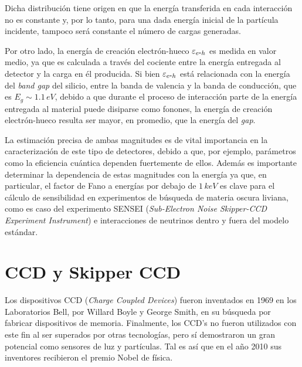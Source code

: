 Dicha distribución tiene origen en que la energía transferida en cada interacción no es constante y, por lo tanto, para una dada energía inicial de la partícula incidente, tampoco será constante el número de cargas generadas.

Por otro lado, la energía de creación electrón-hueco $\varepsilon_{e\mbox{-}h}$ es medida en valor medio, ya que es calculada a través del cociente entre la energía entregada al detector y la carga en él producida. 
Si bien $\varepsilon_{e\mbox{-}h}$ está relacionada con la energía del \textit{band gap} del silicio, entre la banda de valencia y la banda de conducción, que es $E_{g}\sim 1.1\,\si{eV}$\cite{Janesick}, debido a que durante el proceso de interacción parte de la energía entregada al material puede disiparse como fonones, la energía de creación electrón-hueco resulta ser mayor, en promedio, que la energía del \textit{gap}.

La estimación precisa de ambas magnitudes es de vital importancia en la caracterización de este tipo de detectores, debido a que, por ejemplo, parámetros como la eficiencia cuántica dependen fuertemente de ellos. Además es importante determinar la dependencia de estas magnitudes con la energía ya que, en particular, el factor de Fano a energías por debajo de $1\,\si{keV}$ es clave para el cálculo de sensibilidad en experimentos de búsqueda de materia oscura liviana, como es caso del experimento SENSEI (\textit{Sub-Electron Noise Skipper-CCD Experiment Instrument})\cite{barak} e interacciones de neutrinos dentro\cite{moroni1} y fuera del modelo estándar\cite{moroni2}.

\section{CCD y Skipper CCD}
\noindent Los dispositivos CCD (\textit{Charge Coupled Devices}) fueron inventados en 1969 en los Laboratorios Bell, por Willard Boyle y George Smith, en su búsqueda por fabricar dispositivos de memoria. Finalmente, los CCD's no fueron utilizados con este fin al ser superados por otras tecnologías, pero sí demostraron un gran potencial como sensores de luz y partículas. Tal es así que en el año 2010 sus inventores recibieron el premio Nobel de física\cite{Boyle, Smith}.

